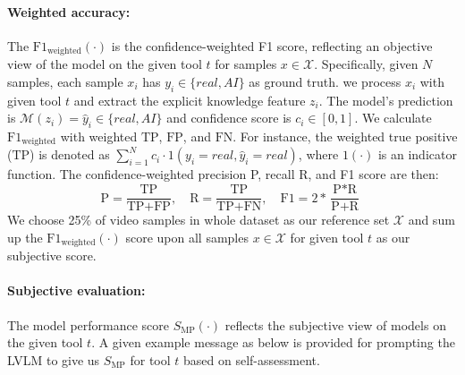 \paragraph{Weighted accuracy:} The $\text{F1}_{\text{weighted}}(\cdot)$ is the confidence-weighted F1 score, reflecting an objective view of the model on the given tool $t$ for samples $x \in \mathcal{X}$. 
Specifically, given $N$ samples, each sample $x_i$ has $y_i \in \{real, AI \}$ as ground truth. 
we process $x_i$ with given tool $t$ and extract the explicit knowledge feature $z_i$. The
model's prediction is $\mathcal{M}(z_i)=\hat{y}_i \in \{real, AI\}$ and confidence score is $c_i \in [0, 1]$. We calculate $\text{F1}_{\text{weighted}}$ with weighted $\text{TP}$, $\text{FP}$, and $\text{FN}$. For instance, the weighted true positive ($\text{TP}$) is denoted as $\sum_{i=1}^N c_i \cdot 1 (y_i=real, \hat{y}_i=real)$, where $1(\cdot)$ is an indicator function.  The confidence-weighted precision P, recall R, and F1 score are then:
\begin{equation}
   \text{P} = \frac{\text{TP}}{\text{TP}+\text{FP}}, \quad \text{R}= \frac{\text{TP}}{\text{TP}+\text{FN}}, \quad  
   \text{F1} =2*\frac{\text{P}*\text{R}}{\text{P}+\text{R}} \ \nonumber
\label{eqn:selection_metrics}
\end{equation}
We choose 25\% of video samples in whole dataset as our reference set $\mathcal{X}$ and sum up the $\text{F1}_{\text{weighted}}(\cdot
)$ score upon all samples $x\in\mathcal{X}$ for given tool $t$ as our subjective score. 

\paragraph{Subjective evaluation:} The model performance score $S_{\text{MP}}(\cdot)$ reflects the subjective view of models on the given tool $t$. A given example message as below is provided for prompting the LVLM to give us $S_{\text{MP}}$ for tool $t$ based on self-assessment.
\vspace{-2mm}

